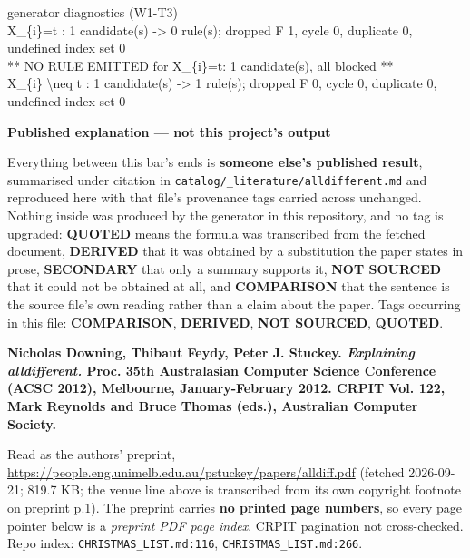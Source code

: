 \documentclass[10pt,a4paper]{article}
\newcommand{\diag}[1]{{\small\itshape\raggedright #1\par}}
\newcommand{\provtag}[2]{{\small\sffamily\bfseries\textcolor{#1}{#2}}}
\newenvironment{pubblock}{%
  \par\smallskip
  \def\FrameCommand{\textcolor{litbar}{\vrule width 2.5pt}\hspace{9pt}}%
  \MakeFramed{\advance\hsize-\width\FrameRestore}}%
  {\endMakeFramed\par\smallskip}
\newcommand{\pubhead}[1]{{\sffamily\bfseries\large\textcolor{litbar}{#1}\par}}
\newcommand{\litsub}[1]{\par\smallskip{\sffamily\bfseries\textcolor{litbar}{#1}\par}}
\begin{document}
\diag{generator diagnostics (W1-T3)\\{} X\_\{i\}=t : 1 candidate(s) -> 0 rule(s); dropped F 1, cycle 0, duplicate 0, undefined index set 0\\{}   ** NO RULE EMITTED for X\_\{i\}=t: 1 candidate(s), all blocked **\\{} X\_\{i\} \textbackslash{}neq t : 1 candidate(s) -> 1 rule(s); dropped F 0, cycle 0, duplicate 0, undefined index set 0}

\begin{pubblock}
\pubhead{Published explanation --- not this project's output}
{\small\sffamily Everything between this bar's ends is \textbf{someone else's published result}, summarised under citation in \texttt{catalog/\_\allowbreak{}literature/alldifferent.md} and reproduced here with that file's provenance tags carried across unchanged. Nothing inside was produced by the generator in this repository, and no tag is upgraded: \provtag{tagquoted}{QUOTED} means the formula was transcribed from the fetched document, \provtag{tagderived}{DERIVED} that it was obtained by a substitution the paper states in prose, \provtag{tagsecondary}{SECONDARY} that only a summary supports it, \provtag{tagnotsourced}{NOT SOURCED} that it could not be obtained at all, and \provtag{tagcomparison}{COMPARISON} that the sentence is the source file's own reading rather than a claim about the paper. Tags occurring in this file: \provtag{tagcomparison}{COMPARISON}, \provtag{tagderived}{DERIVED}, \provtag{tagnotsourced}{NOT SOURCED}, \provtag{tagquoted}{QUOTED}.\par}
\litsub{Citation}
\textbf{Nicholas Downing, Thibaut Feydy, Peter J. Stuckey. \emph{Explaining alldifferent.} Proc. 35th Australasian Computer Science Conference (ACSC 2012), Melbourne, January-February 2012. CRPIT Vol. 122, Mark Reynolds and Bruce Thomas (eds.), Australian Computer Society.}

Read as the authors' preprint, \url{https://people.eng.unimelb.edu.au/pstuckey/papers/alldiff.pdf} (fetched 2026-09-21; 819.7 KB; the venue line above is transcribed from its own copyright footnote on preprint p.1). The preprint carries \textbf{no printed page numbers}, so every page pointer below is a \emph{preprint PDF page index}. CRPIT pagination not cross-checked. Repo index: \texttt{CHRISTMAS\_LIST.md:116}, \texttt{CHRISTMAS\_LIST.md:266}.


\end{pubblock}
\end{document}
